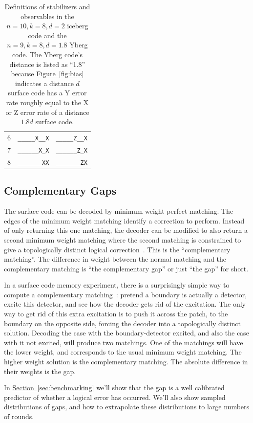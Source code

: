 \documentclass[onecolumn,unpublished,a4paper]{quantumarticle}
\theoremstyle{definition}
\theoremstyle{definition}
\theoremstyle{definition}
\renewcommand{\sec}[1]{\hyperref[sec:#1]{Section~\ref*{sec:#1}}}
\newcommand{\fig}[1]{\hyperref[fig:#1]{Figure~\ref*{fig:#1}}}
\begin{document}
\begin{table}[h]
\begin{tabular}{|c|c|c|}
        6 & \texttt{\_\_\_\_\_X\_\_X} & \texttt{\_\_\_\_\_Z\_\_X} \\
        7 & \texttt{\_\_\_\_\_\_X\_X} & \texttt{\_\_\_\_\_\_Z\_X} \\
        8 & \texttt{\_\_\_\_\_\_\_XX} & \texttt{\_\_\_\_\_\_\_ZX} \\
        \hline
    \end{tabular}
    \caption{
        Definitions of stabilizers and observables in the $n=10,k=8,d=2$ iceberg code and the $n=9,k=8,d=1.8$ Yberg code.
        The Yberg code's distance is listed as ``1.8'' because \fig{bias} indicates a distance $d$ surface code has a Y error rate roughly equal to the X or Z error rate of a distance $1.8d$ surface code.
    }
    \label{tab:codes}
\end{table}


\subsection{Complementary Gaps}

The surface code can be decoded by minimum weight perfect matching.
The edges of the minimum weight matching identify a correction to perform.
Instead of only returning this one matching, the decoder can be modified to also return a second minimum weight matching where the second matching is constrained to give a topologically distinct logical correction~\cite{hutter2014complementarygap,bombin2022postselect}.
This is the ``complementary matching''.
The difference in weight between the normal matching and the complementary matching is ``the complementary gap'' or just ``the gap'' for short.

In a surface code memory experiment, there is a surprisingly simple way to compute a complementary matching~\cite{hutter2014complementarygap,bombin2022postselect}: pretend a boundary is actually a detector, excite this detector, and see how the decoder gets rid of the excitation.
The only way to get rid of this extra excitation is to push it across the patch, to the boundary on the opposite side, forcing the decoder into a topologically distinct solution.
Decoding the case with the boundary-detector excited, and also the case with it not excited, will produce two matchings.
One of the matchings will have the lower weight, and corresponds to the usual minimum weight matching.
The higher weight solution is the complementary matching.
The absolute difference in their weights is the gap.

In \sec{benchmarking} we'll show that the gap is a well calibrated predictor of whether a logical error has occurred.
We'll also show sampled distributions of gaps, and how to extrapolate these distributions to large numbers of rounds.
\end{document}
